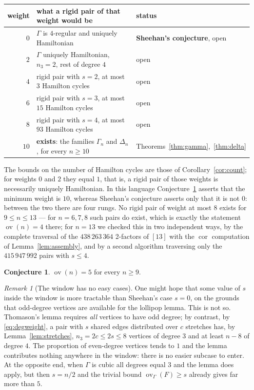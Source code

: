 \documentclass[11pt,a4paper]{article}
\theoremstyle{definition}
\newtheorem{conjecture}[theorem]{Conjecture}
\theoremstyle{remark}
\newtheorem{remark}[theorem]{Remark}
\newcommand{\ov}{\operatorname{ov}}
\newcommand{\cor}{\operatorname{cor}}
\begin{document}
\begin{center}
\begin{tabular}{rll}
\toprule
weight & what a rigid pair of that weight would be & status\\
\midrule
$0$ & $\Gamma$ is $4$-regular and uniquely Hamiltonian & \textbf{Sheehan's conjecture}, open\\
$2$ & $\Gamma$ uniquely Hamiltonian, $n_3=2$, rest of degree $4$ & open\\
$4$ & rigid pair with $s=2$, at most $3$ Hamilton cycles & open\\
$6$ & rigid pair with $s=3$, at most $15$ Hamilton cycles & open\\
$8$ & rigid pair with $s=4$, at most $93$ Hamilton cycles & open\\
$10$ & \textbf{exists}: the families $\Gamma_n$ and $\Delta_n$, for every $n\ge10$ & Theorems~\ref{thm:gamma},~\ref{thm:delta}\\
\bottomrule
\end{tabular}
\end{center}

The bounds on the number of Hamilton cycles are those of Corollary~\ref{cor:count}; for weights $0$ and $2$ they equal $1$, that is, a rigid pair of those weights is necessarily uniquely Hamiltonian. In this language Conjecture~\ref{conj:main} asserts that the minimum weight is $10$, whereas Sheehan's conjecture asserts only that it is not $0$: between the two there are four rungs. No rigid pair of weight at most $8$ exists for $9\le n\le13$ --- for $n=6,7,8$ such pairs do exist, which is exactly the statement $\ov(n)=4$ there; for $n=13$ we checked this in two independent ways, by the complete traversal of the $438\,263\,364$ 2-factors of $[13]$ with the $\cor$ computation of Lemma~\ref{lem:assembly}, and by a second algorithm traversing only the $415\,947\,992$ pairs with $s\le4$.

\begin{conjecture}\label{conj:main}
$\ov(n)=5$ for every $n\ge9$.
\end{conjecture}

\begin{remark}[The window has no easy cases]\label{rem:noeasy}
One might hope that some value of $s$ inside the window is more tractable than Sheehan's case $s=0$, on the grounds that odd-degree vertices are available for the lollipop lemma. This is not so. Thomason's lemma \cite{thomason78} requires \emph{all} vertices to have odd degree; by contrast, by \eqref{eq:degweight}, a pair with $s$ shared edges distributed over $c$ stretches has, by Lemma~\ref{lem:stretches}, $n_3=2c\le2s\le8$ vertices of degree $3$ and at least $n-8$ of degree $4$. The proportion of even-degree vertices tends to $1$ and the lemma contributes nothing anywhere in the window: there is no easier subcase to enter. At the opposite end, when $\Gamma$ is cubic all degrees equal $3$ and the lemma does apply, but then $s=n/2$ and the trivial bound $\ov_\Gamma(F)\ge s$ already gives far more than $5$.
\end{remark}
\end{document}
